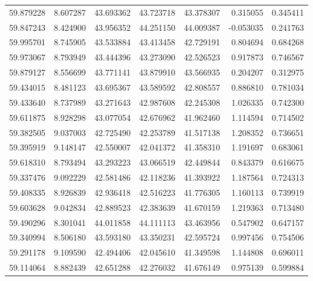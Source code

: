 \begin{tabular}{rrrrrrr}
 59.879228 &   8.607287 &         43.693362 &         43.723718 &         43.378307 &  0.315055 &  0.345411 \\
 59.847243 &   8.424900 &         43.956352 &         44.251150 &         44.009387 & -0.053035 &  0.241763 \\
 59.995701 &   8.745905 &         43.533884 &         43.413458 &         42.729191 &  0.804694 &  0.684268 \\
 59.973067 &   8.793949 &         43.444396 &         43.273090 &         42.526523 &  0.917873 &  0.746567 \\
 59.879127 &   8.556699 &         43.771141 &         43.879910 &         43.566935 &  0.204207 &  0.312975 \\
 59.434015 &   8.481123 &         43.695367 &         43.589592 &         42.808557 &  0.886810 &  0.781034 \\
 59.433640 &   8.737989 &         43.271643 &         42.987608 &         42.245308 &  1.026335 &  0.742300 \\
 59.611875 &   8.928298 &         43.077054 &         42.676962 &         41.962460 &  1.114594 &  0.714502 \\
 59.382505 &   9.037003 &         42.725490 &         42.253789 &         41.517138 &  1.208352 &  0.736651 \\
 59.395919 &   9.148147 &         42.550007 &         42.041372 &         41.358310 &  1.191697 &  0.683061 \\
 59.618310 &   8.793494 &         43.293223 &         43.066519 &         42.449844 &  0.843379 &  0.616675 \\
 59.337476 &   9.092229 &         42.581486 &         42.118236 &         41.393922 &  1.187564 &  0.724313 \\
 59.408335 &   8.926839 &         42.936418 &         42.516223 &         41.776305 &  1.160113 &  0.739919 \\
 59.603628 &   9.042834 &         42.889523 &         42.383639 &         41.670159 &  1.219363 &  0.713480 \\
 59.490296 &   8.301041 &         44.011858 &         44.111113 &         43.463956 &  0.547902 &  0.647157 \\
 59.340994 &   8.506180 &         43.593180 &         43.350231 &         42.595724 &  0.997456 &  0.754506 \\
 59.291178 &   9.109590 &         42.494406 &         42.045610 &         41.349598 &  1.144808 &  0.696011 \\
 59.114064 &   8.882439 &         42.651288 &         42.276032 &         41.676149 &  0.975139 &  0.599884 \\

\end{tabular}
